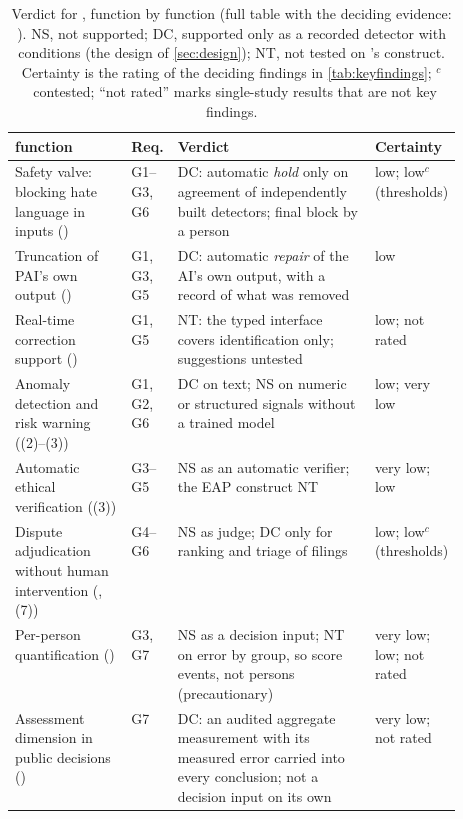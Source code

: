 \begin{table}[t]
\centering
\footnotesize
\caption{Verdict for \pol{}, function by function (full table with the deciding evidence: ). NS, not supported; DC, supported only as a recorded detector with conditions (the design of \cref{sec:design}); NT, not tested on \pol{}'s construct. Certainty is the rating of the deciding findings in \cref{tab:keyfindings}; $^{c}$~contested; ``not rated'' marks single-study results that are not key findings.}
\label{tab:verdict-summary}
\begin{tabularx}{\linewidth}{@{}>{\raggedright\arraybackslash}p{0.26\linewidth}>{\raggedright\arraybackslash}p{0.09\linewidth}L>{\raggedright\arraybackslash}p{0.17\linewidth}@{}}
\toprule
\pol{} function & Req. & Verdict & Certainty \\
\midrule
Safety valve: blocking hate language in inputs () & G1--G3, G6 & DC: automatic \emph{hold} only on agreement of independently built detectors; final block by a person & low; low$^{c}$ (thresholds) \\
Truncation of PAI's own output () & G1, G3, G5 & DC: automatic \emph{repair} of the AI's own output, with a record of what was removed & low \\
Real-time correction support () & G1, G5 & NT: the typed interface covers identification only; suggestions untested & low; not rated \\
Anomaly detection and risk warning ((2)--(3)) & G1, G2, G6 & DC on text; NS on numeric or structured signals without a trained model & low; very low \\
Automatic ethical verification ((3)) & G3--G5 & NS as an automatic verifier; the EAP construct NT & very low; low \\
Dispute adjudication without human intervention (, (7)) & G4--G6 & NS as judge; DC only for ranking and triage of filings & low; low$^{c}$ (thresholds) \\
Per-person quantification () & G3, G7 & NS as a decision input; NT on error by group, so score events, not persons (precautionary) & very low; low; not rated \\
Assessment dimension in public decisions () & G7 & DC: an audited aggregate measurement with its measured error carried into every conclusion; not a decision input on its own & very low; not rated \\
\bottomrule
\end{tabularx}
\end{table}

